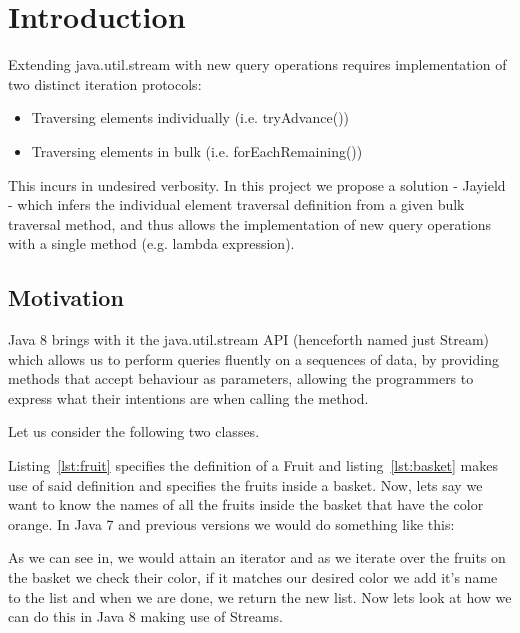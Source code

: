 \chapter{Introduction}
Extending java.util.stream with new query operations requires implementation of two distinct iteration protocols:
\begin{itemize}
\item Traversing elements individually (i.e. tryAdvance())
\item Traversing elements in bulk (i.e. forEachRemaining())
\end{itemize}
This incurs in undesired verbosity. In this project we propose a solution - Jayield - which infers the individual element traversal definition from a given bulk traversal method, and thus allows the implementation of new query operations with a single method (e.g. lambda expression).


\section{Motivation}

Java 8 brings with it the java.util.stream API (henceforth named just Stream) which allows us to perform queries fluently on a sequences of data, by providing methods that accept behaviour as parameters, allowing the programmers to express what their intentions are when calling the method.

\newpage
Let us consider the following two classes.



Listing~\ref{lst:fruit} specifies the definition of a Fruit and listing~\ref{lst:basket} makes use of said definition and specifies the fruits inside a basket. Now, lets say we want to know the names of all the fruits inside the basket that have the color orange. In Java 7 and previous versions we would do something like this:



\newpage
As we can see in, we would attain an iterator and as we iterate over the fruits on the basket we check their color, if it matches our desired color we add it's name to the list and when we are done, we return the new list. Now lets look at how we can do this in Java 8 making use of Streams.

